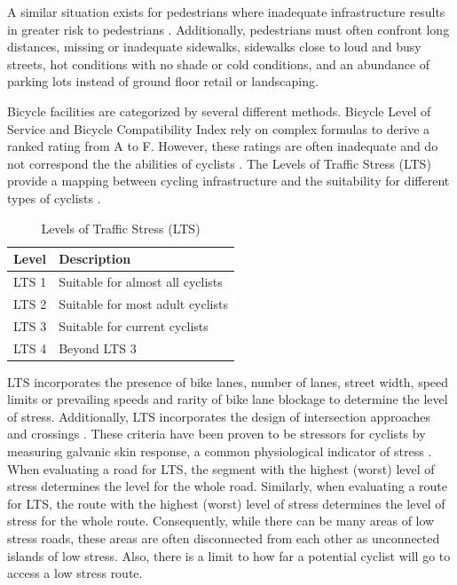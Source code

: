 \documentclass{article}
\begin{document}
A similar situation exists for pedestrians where inadequate infrastructure results in greater risk to pedestrians \citep{who2013}. Additionally, pedestrians must often confront long distances, missing or inadequate sidewalks, sidewalks close to loud and busy streets, hot conditions with no shade or cold conditions, and an abundance of parking lots instead of ground floor retail or landscaping.

Bicycle facilities are categorized by several different methods. Bicycle Level of Service and Bicycle Compatibility Index rely on complex formulas to derive a ranked rating from A to F. However, these ratings are often inadequate and do not correspond the the abilities of cyclists \citep[Page 13]{mekuria2012}. The Levels of Traffic Stress (LTS) provide a mapping between cycling infrastructure and the suitability for different types of cyclists \citep[Page 13-14]{mekuria2012}.

\begin{table}[h]
  \centering
\begin{tabular}{ l l }
    Level & Description \\
    \hline
    LTS 1 & Suitable for almost all cyclists \\
    LTS 2 & Suitable for most adult cyclists \\
    LTS 3 & Suitable for current cyclists \\
    LTS 4 & Beyond LTS 3 \\
\end{tabular}
    \caption{Levels of Traffic Stress (LTS) \citep{mekuria2012}}
    \label{table:lts}
\end{table}

LTS incorporates the presence of bike lanes, number of lanes, street width, speed limits or prevailing speeds and rarity of bike lane blockage to determine the level of stress. Additionally, LTS incorporates the design of intersection approaches and crossings \citep[Page 17-21]{mekuria2012}. These criteria have been proven to be stressors for cyclists by measuring galvanic skin response, a common physiological indicator of stress \citep{caviedes2016} \citep{liu2016}. When evaluating a road for LTS, the segment with the highest (worst) level of stress determines the level for the whole road. Similarly, when evaluating a route for LTS, the route with the highest (worst) level of stress determines the level of stress for the whole route. Consequently, while there can be many areas of low stress roads, these areas are often disconnected from each other as unconnected islands of low stress. Also, there is a limit to how far a potential cyclist will go to access a low stress route.
\end{document}
